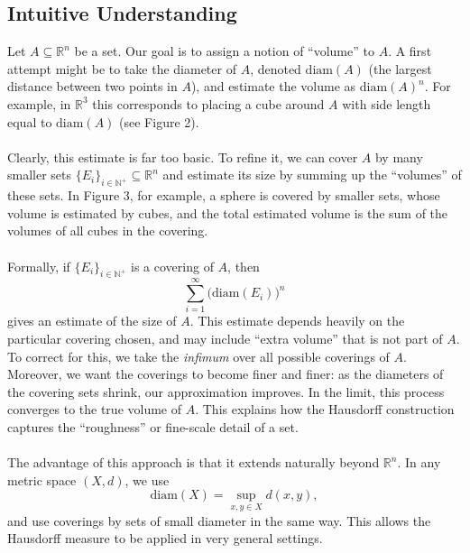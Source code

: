 \documentclass{article}
\theoremstyle{plain}
\theoremstyle{definition}
\theoremstyle{remark}
\begin{document}
\subsection{Intuitive Understanding}
Let $A \subseteq \mathbb{R}^n$ be a set. Our goal is to assign a notion of ``volume'' to $A$.  
A first attempt might be to take the diameter of $A$, denoted $\mathrm{diam}(A)$ (the largest distance between two points in $A$), and estimate the volume as $\mathrm{diam}(A)^n$. For example, in $\mathbb{R}^3$ this corresponds to placing a cube around $A$ with side length equal to $\mathrm{diam}(A)$ (see Figure 2).  
~\\~\\
Clearly, this estimate is far too basic. To refine it, we can cover $A$ by many smaller sets $\{E_i\}_{i \in \mathbb{N}^+} \subseteq \mathbb{R}^n$ and estimate its size by summing up the ``volumes'' of these sets. In Figure 3, for example, a sphere is covered by smaller sets, whose volume is estimated by cubes, and the total estimated volume is the sum of the volumes of all cubes in the covering.
~\\~\\
Formally, if $\{E_i\}_{i \in \mathbb{N}^+}$ is a covering of $A$, then
\[
\sum_{i=1}^\infty \bigl(\mathrm{diam}(E_i)\bigr)^n
\]
gives an estimate of the size of $A$.  
This estimate depends heavily on the particular covering chosen, and may include ``extra volume'' that is not part of $A$. To correct for this, we take the \emph{infimum} over all possible coverings of $A$.  
Moreover, we want the coverings to become finer and finer: as the diameters of the covering sets shrink, our approximation improves. In the limit, this process converges to the true volume of $A$. This explains how the Hausdorff construction captures the ``roughness'' or fine-scale detail of a set.
~\\~\\
The advantage of this approach is that it extends naturally beyond $\mathbb{R}^n$. In any metric space $(X,d)$, we use
\[
\mathrm{diam}(X) = \sup_{x,y \in X} d(x,y),
\]
and use coverings by sets of small diameter in the same way. This allows the Hausdorff measure to be applied in very general settings.
\end{document}
